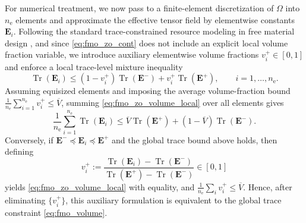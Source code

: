 \documentclass[preprint,3p]{elsarticle}
\newcommand{\tensf}[1]{\bm{\mathbf{#1}}}            %
\newcommand{\Ei}{\tensf{E}_i}                       %
\newcommand{\Emin}{\tensf{E}^{-}}                   %
\newcommand{\Emax}{\tensf{E}^{+}}                   %
\newcommand{\nel}{n_\mathrm{e}}                     %
\newcommand{\Tr}{\operatorname{Tr}}
\begin{document}
For numerical treatment, we now pass to a finite-element discretization of $\Omega$ into $\nel$ elements and approximate the effective tensor field by elementwise constants $\Ei$. Following the standard trace-constrained resource modeling in free material design \citep{Ringertz1993,Bendsoe1995,Zowe1997,BenTal2000,Czarnecki2012,Czarnecki2014}, and since \eqref{eq:fmo_zo_cont} does not include an explicit local volume fraction variable, we introduce auxiliary elementwise volume fractions $v_i^+\in[0,1]$ and enforce a local trace-level mixture inequality
%
\begin{equation}\label{eq:fmo_zo_volume_local}
\Tr(\Ei)\le (1-v_i^+)\Tr(\Emin)+v_i^+\Tr(\Emax),\qquad i=1,\dots,\nel.
\end{equation}
%
Assuming equisized elements and imposing the average volume-fraction bound $\frac{1}{\nel}\sum_{i=1}^{\nel} v_i^+\le \overline{V}$, summing \eqref{eq:fmo_zo_volume_local} over all elements gives
%
\begin{equation}
\frac{1}{\nel}\sum_{i=1}^{\nel}\Tr(\Ei)
\le \overline{V}\Tr(\Emax)+(1-\overline{V})\Tr(\Emin).
\end{equation}
%
Conversely, if $\Emin\preceq \Ei\preceq \Emax$ and the global trace bound above holds, then defining
%
\begin{equation}
v_i^+:=\frac{\Tr(\Ei)-\Tr(\Emin)}{\Tr(\Emax)-\Tr(\Emin)}\in[0,1]
\end{equation}
%
yields \eqref{eq:fmo_zo_volume_local} with equality, and $\frac1{\nel}\sum_i v_i^+\le \overline V$. Hence, after eliminating $\{v_i^+\}$, this auxiliary formulation is equivalent to the global trace constraint \eqref{eq:fmo_volume}.
\end{document}
